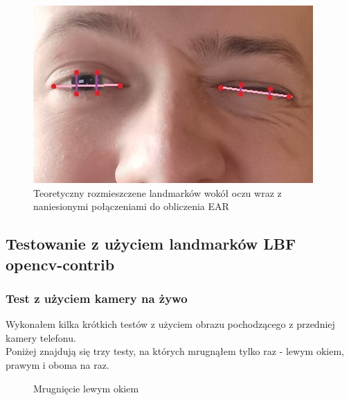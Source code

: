 \begin{figure}[!h]
    \begin{center}
        \includegraphics[scale=0.35]{img/landmark_section/theoretical_eye_landmarks.jpg}
        \caption{Teoretyczny rozmieszczene landmarków wokół oczu wraz z naniesionymi połączeniami do obliczenia EAR}
        \label{fig:theoretical_eye_landmarks}
    \end{center}
\end{figure}


\subsection{Testowanie z użyciem landmarków LBF opencv-contrib
}

\subsubsection{Test z użyciem kamery na żywo}

Wykonałem kilka krótkich testów z użyciem obrazu pochodzącego z przedniej kamery telefonu. 
\\
Poniżej znajdują się trzy testy, na których mrugnąłem tylko raz - lewym okiem, prawym i oboma na raz.

\begin{figure}[!h]
    \centering
    \caption{Mrugnięcie lewym okiem}
    \label{fig:left_eye_blink}
\end{figure}


